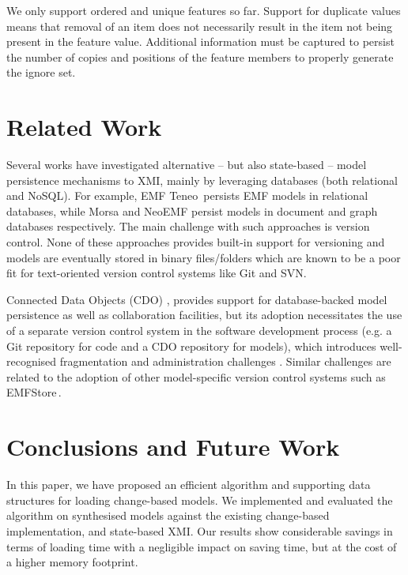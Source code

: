 \documentclass{llncs}
\begin{document}
We only support ordered and unique features so far. Support for duplicate values means that removal of an item does not necessarily result in the item not being present in the feature value. Additional information must be captured to persist the number of copies and positions of the feature members to properly generate the ignore set. 

\section{Related Work}
\label{sec:related_work}

Several works have investigated alternative -- but also state-based -- model persistence mechanisms to XMI, mainly by leveraging databases (both relational and NoSQL). For example, EMF Teneo\,\cite{eclipse2017teneo} persists EMF models in relational databases, while Morsa \cite{pagan2011morsa} and NeoEMF \cite{daniel2016neoemf} persist models in document and graph databases respectively. The main challenge with such approaches is version control. None of these approaches provides built-in support for versioning and models are eventually stored in binary files/folders which are known to be a poor fit for text-oriented version control systems like Git and SVN.

Connected Data Objects (CDO) \cite{eclipse2017cdo}, provides support for database-backed model persistence as well as collaboration facilities, but its adoption necessitates the use of a separate version control system in the software development process (e.g. a Git repository for code and a CDO repository for models), which introduces well-recognised fragmentation and administration challenges \cite{barmpis2014evaluation}. Similar challenges are related to the adoption of other model-specific version control systems such as EMFStore\,\cite{koegel2010emfstore}.

\section{Conclusions and Future Work}
\label{sec:conclusions}
In this paper, we have proposed an efficient algorithm and supporting data structures for loading change-based models.
We implemented and evaluated the algorithm on synthesised models against the existing change-based implementation, and state-based XMI. 
Our results show considerable savings in terms of loading time with a negligible impact on saving time, but at the cost of a higher memory footprint.
\end{document}
